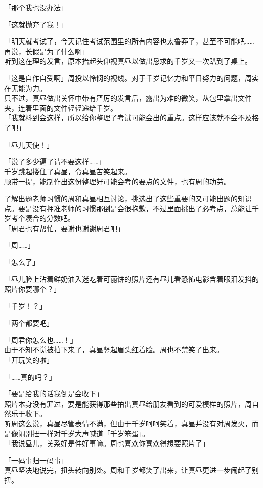 「那个我也没办法」

「这就抛弃了我！」

「明天就考试了，今天记住考试范围里的所有内容也太鲁莽了，甚至不可能吧……再说，长假是为了什么啊」\\

听到这在理的发言，原本抬起头仰视真昼以做出恳求的千岁又一次趴到了桌上。

「这是自作自受啊」周投以怜悯的视线。对于千岁记忆力和平日努力的问题，周实在无能为力。\\

只不过，真昼做出关怀中带有严厉的发言后，露出为难的微笑，从包里拿出文件夹，连着里面的文件轻轻递给千岁。\\

「我就料到会这样，所以给你整理了考试可能会出的重点。这样应该就不会不及格了吧」

「昼儿天使！」

「说了多少遍了请不要这样……」\\

千岁跳起搂住了真昼，令真昼苦笑起来。\\

顺带一提，能制作出这份整理好可能会考的要点的文件，也有周的功劳。

了解出题老师习惯的周和真昼相互讨论，挑选出了这些重要的又可能出题的知识点。要是没有押准老师的习惯那倒是会很抱歉，不过里面挑出了必考点，总能让千岁考个凑合的分数吧。\\

「周君也有帮忙，要谢也谢谢周君吧」

「周……」

「怎么了」

「昼儿脸上沾着鲜奶油入迷吃着可丽饼的照片还有昼儿看恐怖电影含着眼泪发抖的照片你要哪个？」

「千岁！？」

「两个都要吧」

「周君你怎么也……！」\\

由于不知不觉被拍下来了，真昼竖起眉头红着脸。周也不禁笑了出来。\\

「开玩笑的啦」

「……真的吗？」

「要是给我的话我倒是会收下」\\

照片本身没有罪过，要是能获得那些拍出真昼给朋友看到的可爱模样的照片，周自然乐于收下。\\

听周这么说，真昼尽管表情不满，但由于千岁呵呵笑着，真昼并没有对周发火，而是像闹别扭一样对千岁大声喊道「千岁笨蛋」。\\

「我说昼儿，关系好是件好事嘛。周也喜欢你喜欢得想要照片了」

「一码事归一码事」\\

真昼坚决地说完，扭头转向别处。周和千岁都笑了出来，让真昼更进一步闹起了别扭。
